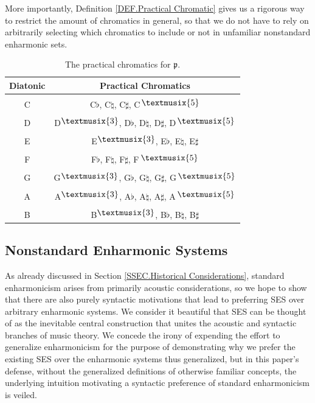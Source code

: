 \documentclass{article}
\theoremstyle{plain}
\theoremstyle{definition}
\theoremstyle{remark}
\newcommand*\doubleflat{\raisebox{.6ex}{\textmusix{3}}}
\newcommand*\doublesharp{\raisebox{.6ex}{\textmusix{5}}}
\begin{document}
More importantly, Definition \ref{DEF.Practical Chromatic} gives us a rigorous way to restrict the amount of  chromatics in general, so that we do not have to rely on arbitrarily selecting which chromatics to include or not in unfamiliar nonstandard enharmonic sets.

\begin{table}[htp]{
	\begin{center}
	\begin{tabular}{c|c}
		Diatonic & Practical Chromatics \\ \hline \\[-1em]
		C & C$\flat$, C$\natural$, C$\sharp$, C$\,\doublesharp$ \\ \\[-1em]
		D & D$\doubleflat$, D$\flat$, D$\natural$, D$\sharp$, D$\,\doublesharp$ \\ \\[-1em]
		E & E$\doubleflat$, E$\flat$, E$\natural$, E$\sharp$ \\ \\[-1em]
		F & F$\flat$, F$\natural$, F$\sharp$, F$\,\doublesharp$ \\ \\[-1em]
		G & G$\doubleflat$, G$\flat$, G$\natural$, G$\sharp$, G$\,\doublesharp$ \\ \\[-1em]
		A & A$\doubleflat$, A$\flat$, A$\natural$, A$\sharp$, A$\,\doublesharp$ \\ \\[-1em]
		B & B$\doubleflat$, B$\flat$, B$\natural$, B$\sharp$ \\
	\end{tabular}
	\end{center}}
	\caption{The practical chromatics for $\mathfrak{p}$.}
	\label{TAB.Practical Chromatics for p}
\end{table}

\subsection{Nonstandard Enharmonic Systems}
\label{SSEC.Nonstandard Enharmonic Systems}

As already discussed in Section \ref{SSEC.Historical Considerations}, standard enharmonicism arises from primarily acoustic considerations, so we hope to show that there are also purely syntactic motivations that lead to preferring SES over arbitrary enharmonic systems. We consider it beautiful that SES can be thought of as the inevitable central construction that unites the acoustic and syntactic branches of music theory. We concede the irony of expending the effort to generalize enharmonicism for the purpose of demonstrating why we prefer the existing SES over the enharmonic systems thus generalized, but in this paper's defense, without the generalized definitions of otherwise familiar concepts, the underlying intuition motivating a syntactic preference of standard enharmonicism is veiled.
\end{document}
